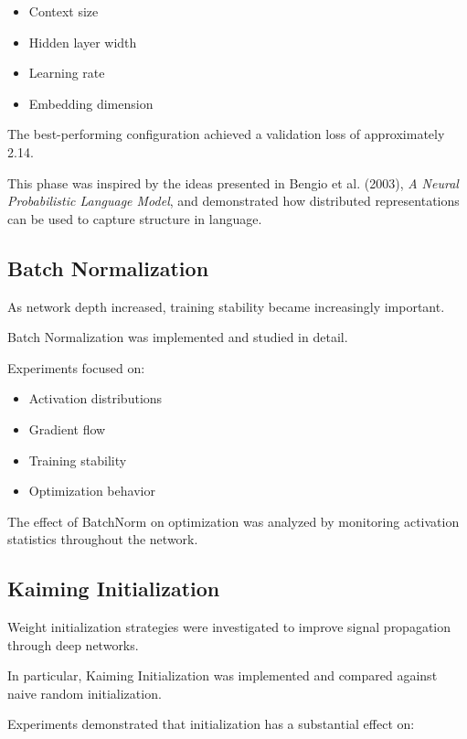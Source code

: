 \documentclass[11pt,a4paper]{article}
\begin{document}
\begin{itemize}
    \item Context size
    \item Hidden layer width
    \item Learning rate
    \item Embedding dimension
\end{itemize}

The best-performing configuration achieved a validation loss of approximately 2.14.

This phase was inspired by the ideas presented in Bengio et al. (2003), \emph{A Neural Probabilistic Language Model}, and demonstrated how distributed representations can be used to capture structure in language.



\subsection{Batch Normalization}

As network depth increased, training stability became increasingly important.

Batch Normalization was implemented and studied in detail.

Experiments focused on:

\begin{itemize}
    \item Activation distributions
    \item Gradient flow
    \item Training stability
    \item Optimization behavior
\end{itemize}

The effect of BatchNorm on optimization was analyzed by monitoring activation statistics throughout the network.

\subsection{Kaiming Initialization}

Weight initialization strategies were investigated to improve signal propagation through deep networks.

In particular, Kaiming Initialization was implemented and compared against naive random initialization.

Experiments demonstrated that initialization has a substantial effect on:
\end{document}
